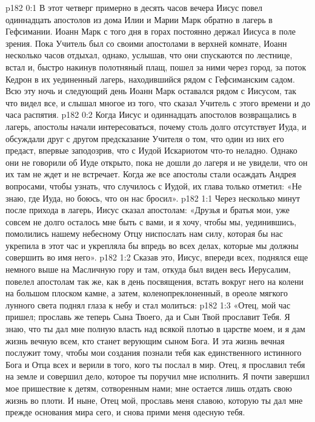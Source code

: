 \author{Комиссия срединников}
\vs p182 0:1 В этот четверг примерно в десять часов вечера Иисус повел одиннадцать апостолов из дома Илии и Марии Марк обратно в лагерь в Гефсимании. Иоанн Марк с того дня в горах постоянно держал Иисуса в поле зрения. Пока Учитель был со своими апостолами в верхней комнате, Иоанн несколько часов отдыхал, однако, услышав, что они спускаются по лестнице, встал и, быстро накинув полотняный плащ, пошел за ними через город, за поток Кедрон в их уединенный лагерь, находившийся рядом с Гефсиманским садом. Всю эту ночь и следующий день Иоанн Марк оставался рядом с Иисусом, так что видел все, и слышал многое из того, что сказал Учитель с этого времени и до часа распятия.
\vs p182 0:2 Когда Иисус и одиннадцать апостолов возвращались в лагерь, апостолы начали интересоваться, почему столь долго отсутствует Иуда, и обсуждали друг с другом предсказание Учителя о том, что один из них его предаст, впервые заподозрив, что с Иудой Искариотом что\hyp{}то неладно. Однако они не говорили об Иуде открыто, пока не дошли до лагеря и не увидели, что он их там не ждет и не встречает. Когда же все апостолы стали осаждать Андрея вопросами, чтобы узнать, что случилось с Иудой, их глава только отметил: «Не знаю, где Иуда, но боюсь, что он нас бросил».
\vs p182 1:1 Через несколько минут после прихода в лагерь, Иисус сказал апостолам: «Друзья и братья мои, уже совсем не долго осталось мне быть с вами, и я хочу, чтобы мы, уединившись, помолились нашему небесному Отцу ниспослать нам силу, которая бы нас укрепила в этот час и укрепляла бы впредь во всех делах, которые мы должны совершить во имя него».
\vs p182 1:2 Сказав это, Иисус, впереди всех, поднялся еще немного выше на Масличную гору и там, откуда был виден весь Иерусалим, повелел апостолам так же, как в день посвящения, встать вокруг него на колени на большом плоском камне, а затем, коленопреклоненный, в ореоле мягкого лунного света поднял глаза к небу и стал молиться:
\vs p182 1:3 «Отец, мой час пришел; прославь же теперь Сына Твоего, да и Сын Твой прославит Тебя. Я знаю, что ты дал мне полную власть над всякой плотью в царстве моем, и я дам жизнь вечную всем, кто станет верующим сыном Бога. И эта жизнь вечная послужит тому, чтобы мои создания познали тебя как единственного истинного Бога и Отца всех и верили в того, кого ты послал в мир. Отец, я прославил тебя на земле и совершил дело, которое ты поручил мне исполнить. Я почти завершил мое пришествие к детям, сотворенным нами; мне остается лишь отдать свою жизнь во плоти. И ныне, Отец мой, прославь меня славою, которую ты дал мне прежде основания мира сего, и снова прими меня одесную тебя.
